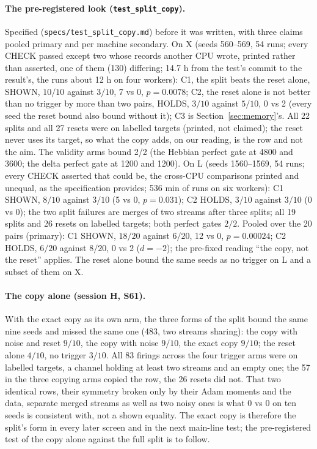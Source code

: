 \documentclass[11pt]{article}
\begin{document}
\paragraph{The pre-registered look (\texttt{test\_split\_copy}).} Specified (\texttt{specs/test\_split\_copy.md}) before it was written, with three claims pooled primary and per machine secondary. On X (seeds 560--569, 54 runs; every CHECK passed except two whose records another CPU wrote, printed rather than asserted, one of them (130) differing; 14.7 h from the test's commit to the result's, the runs about 12 h on four workers): C1, the split beats the reset alone, SHOWN, $10/10$ against $3/10$, 7 vs 0, $p = 0.0078$; C2, the reset alone is not better than no trigger by more than two pairs, HOLDS, $3/10$ against $5/10$, 0 vs 2 (every seed the reset bound also bound without it); C3 is Section~\ref{sec:memory}'s. All 22 splits and all 27 resets were on labelled targets (printed, not claimed); the reset never uses its target, so what the copy adds, on our reading, is the row and not the aim. The validity arms bound 2/2 (the Hebbian perfect gate at 4800 and 3600; the delta perfect gate at 1200 and 1200). On L (seeds 1560--1569, 54 runs; every CHECK asserted that could be, the cross-CPU comparisons printed and unequal, as the specification provides; 536 min of runs on six workers): C1 SHOWN, $8/10$ against $3/10$ (5 vs 0, $p = 0.031$); C2 HOLDS, $3/10$ against $3/10$ (0 vs 0); the two split failures are merges of two streams after three splits; all 19 splits and 26 resets on labelled targets; both perfect gates $2/2$. Pooled over the 20 pairs (primary): C1 SHOWN, $18/20$ against $6/20$, 12 vs 0, $p = 0.00024$; C2 HOLDS, $6/20$ against $8/20$, 0 vs 2 ($d = -2$); the pre-fixed reading ``the copy, not the reset'' applies. The reset alone bound the same seeds as no trigger on L and a subset of them on X.

\paragraph{The copy alone (session H, S61).} With the exact copy as its own arm, the three forms of the split bound the same nine seeds and missed the same one (483, two streams sharing): the copy with noise and reset $9/10$, the copy with noise $9/10$, the exact copy $9/10$; the reset alone $4/10$, no trigger $3/10$. All 83 firings across the four trigger arms were on labelled targets, a channel holding at least two streams and an empty one; the 57 in the three copying arms copied the row, the 26 resets did not. That two identical rows, their symmetry broken only by their Adam moments and the data, separate merged streams as well as two noisy ones is what 0 vs 0 on ten seeds is consistent with, not a shown equality. The exact copy is therefore the split's form in every later screen and in the next main-line test; the pre-registered test of the copy alone against the full split is to follow.
\end{document}
